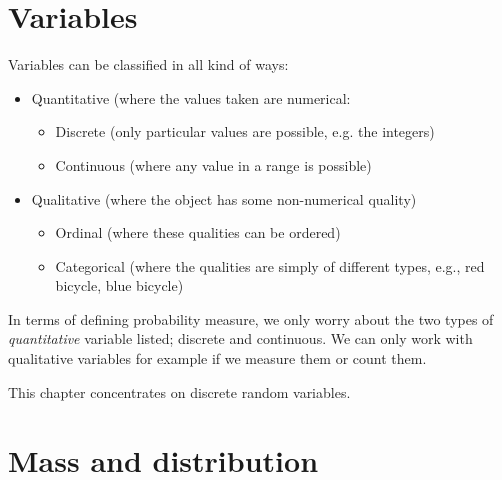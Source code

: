 \documentclass[12pt]{extbook}
\begin{document}
\section{Variables}

Variables can be classified in all kind of ways:
\begin{itemize}
\item Quantitative (where the values taken are numerical:
  \begin{itemize}
  \item Discrete (only particular values are possible, e.g. the
    integers)
  \item Continuous (where any value in a range is possible)
  \end{itemize}
\item Qualitative (where the object has some non-numerical quality)
  \begin{itemize}
  \item Ordinal (where these qualities can be ordered)
  \item Categorical (where the qualities are simply of different
    types, e.g., red bicycle, blue bicycle)
  \end{itemize}
\end{itemize}


In terms of defining probability measure, we 
only worry about the two
types of \emph{quantitative} variable listed; discrete and continuous.  
We can only work with qualitative variables for example if we measure
them or count them.





This chapter concentrates on discrete random variables.




\section{Mass and distribution}
\end{document}
